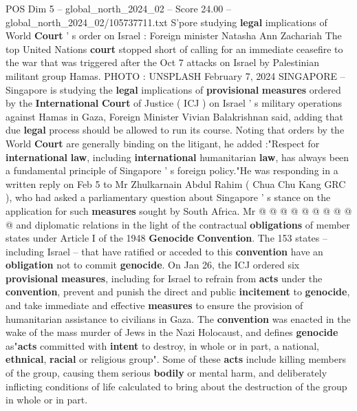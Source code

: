 \begin{textsample}{POS Dim 5 – global\_north\_2024\_02 – Score 24.00 – global\_north\_2024\_02/105737711.txt}  \label{ex:f5_pos_241}
S'pore studying \textbf{legal} implications of World \textbf{Court} ' s order on Israel : Foreign minister Natasha Ann Zachariah The top United Nations \textbf{court} stopped short of calling for an immediate ceasefire to the war that was triggered after the Oct 7 attacks on Israel by Palestinian militant group Hamas.
PHOTO : UNSPLASH February 7, 2024 SINGAPORE -- Singapore is studying the \textbf{legal} implications of \textbf{provisional} \textbf{measures} ordered by the \textbf{International} \textbf{Court} of Justice ( ICJ ) on Israel ' s military operations against Hamas in Gaza, Foreign Minister Vivian Balakrishnan said, adding that due \textbf{legal} process should be allowed to run its course.
Noting that orders by the World \textbf{Court} are generally binding on the litigant, he added :"Respect for \textbf{international} \textbf{law}, including \textbf{international} humanitarian \textbf{law}, has always been a fundamental principle of Singapore ' s foreign policy."He was responding in a written reply on Feb 5 to Mr Zhulkarnain Abdul Rahim ( Chua Chu Kang GRC ), who had asked a parliamentary question about Singapore ' s stance on the application for such \textbf{measures} sought by South Africa.
Mr @ @ @ @ @ @ @ @ @ @ and diplomatic relations in the light of the contractual \textbf{obligations} of member states under Article I of the 1948 \textbf{Genocide} \textbf{Convention}.
The 153 states -- including Israel -- that have ratified or acceded to this \textbf{convention} have an \textbf{obligation} not to commit \textbf{genocide}.
On Jan 26, the ICJ ordered six \textbf{provisional} \textbf{measures}, including for Israel to refrain from \textbf{acts} under the \textbf{convention}, prevent and punish the direct and public \textbf{incitement} to \textbf{genocide}, and take immediate and effective \textbf{measures} to ensure the provision of humanitarian assistance to civilians in Gaza.
The \textbf{convention} was enacted in the wake of the mass murder of Jews in the Nazi Holocaust, and defines \textbf{genocide} as"\textbf{acts} committed with \textbf{intent} to destroy, in whole or in part, a national, \textbf{ethnical}, \textbf{racial} or religious group".
Some of these \textbf{acts} include killing members of the group, causing them serious \textbf{bodily} or mental harm, and deliberately inflicting conditions of life calculated to bring about the destruction of the group in whole or in part.

\end{textsample}
